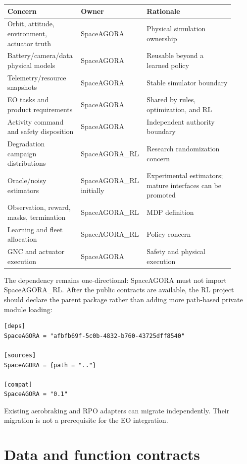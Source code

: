 \documentclass[11pt]{article}
\begin{document}
\begin{longtable}{P{0.31\linewidth}P{0.22\linewidth}P{0.38\linewidth}}
\toprule
Concern & Owner & Rationale \\
\midrule
\endhead
Orbit, attitude, environment, actuator truth & SpaceAGORA & Physical simulation ownership \\
Battery/camera/data physical models & SpaceAGORA & Reusable beyond a learned policy \\
Telemetry/resource snapshots & SpaceAGORA & Stable simulator boundary \\
EO tasks and product requirements & SpaceAGORA & Shared by rules, optimization, and RL \\
Activity command and safety disposition & SpaceAGORA & Independent authority boundary \\
Degradation campaign distributions & SpaceAGORA\_RL & Research randomization concern \\
Oracle/noisy estimators & SpaceAGORA\_RL initially & Experimental estimators; mature interfaces can be promoted \\
Observation, reward, masks, termination & SpaceAGORA\_RL & MDP definition \\
Learning and fleet allocation & SpaceAGORA\_RL & Policy concern \\
GNC and actuator execution & SpaceAGORA & Safety and physical execution \\
\bottomrule
\end{longtable}

The dependency remains one-directional: SpaceAGORA must not import
SpaceAGORA\_RL.  After the public contracts are available, the RL project
should declare the parent package rather than adding more path-based private
module loading:

\begin{verbatim}
[deps]
SpaceAGORA = "afbfb69f-5c0b-4832-b760-43725dff8540"

[sources]
SpaceAGORA = {path = ".."}

[compat]
SpaceAGORA = "0.1"
\end{verbatim}

Existing aerobraking and RPO adapters can migrate independently.  Their
migration is not a prerequisite for the EO integration.

\section{Data and function contracts}
\end{document}
